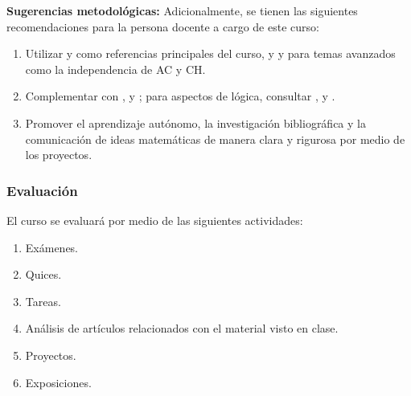 \begin{refsection}
\textbf{Sugerencias metodológicas:} Adicionalmente, se tienen las siguientes recomendaciones para la persona docente a cargo de este curso:

\begin{enumerate}
    \item Utilizar \cite{Hal74} y \cite{End77} como referencias principales del curso, y \cite{Jec03} y \cite{Kun80} para temas avanzados como la independencia de AC y CH.
    \item Complementar con \cite{Dev93}, \cite{Sup72} y \cite{Hal17}; para aspectos de lógica, consultar \cite{HiL19}, \cite{CL2000} y \cite{EFT94}.
    \item Promover el aprendizaje autónomo, la investigación bibliográfica y la comunicación de ideas matemáticas de manera clara y rigurosa por medio de los proyectos.
\end{enumerate}

\subsubsection*{Evaluación}

El curso se evaluará por medio de las siguientes actividades:

\begin{enumerate}
\item Exámenes.
\item Quices.
\item Tareas.
\item Análisis de artículos relacionados con el material visto en clase.
\item Proyectos.
\item Exposiciones.
\end{enumerate}

\nocite{Hal74}
\nocite{Jec03}
\nocite{Kun80}
\nocite{End77}
\nocite{Dev93}
\nocite{Sup72}
\nocite{Hal17}
\nocite{HiL19}
\nocite{CL2000}
\nocite{EFT94}

\printcursosbibliography
\end{refsection}
